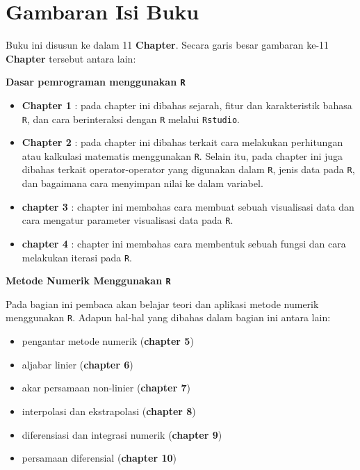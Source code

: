 \documentclass[
]{book}
\providecommand{\tightlist}{%
  \setlength{\itemsep}{0pt}\setlength{\parskip}{0pt}}
\theoremstyle{definition}
\theoremstyle{definition}
\theoremstyle{definition}
\theoremstyle{definition}
\theoremstyle{remark}
\begin{document}
\hypertarget{gambaran-isi-buku}{%
\section*{Gambaran Isi Buku}\label{gambaran-isi-buku}}

Buku ini disusun ke dalam 11 \textbf{Chapter}. Secara garis besar gambaran ke-11 \textbf{Chapter} tersebut antara lain:

\textbf{Dasar pemrograman menggunakan \texttt{R}}

\begin{itemize}
\tightlist
\item
  \textbf{Chapter 1} : pada chapter ini dibahas sejarah, fitur dan karakteristik bahasa \texttt{R}, dan cara berinteraksi dengan \texttt{R} melalui \texttt{Rstudio}.
\item
  \textbf{Chapter 2} : pada chapter ini dibahas terkait cara melakukan perhitungan atau kalkulasi matematis menggunakan \texttt{R}. Selain itu, pada chapter ini juga dibahas terkait operator-operator yang digunakan dalam \texttt{R}, jenis data pada \texttt{R}, dan bagaimana cara menyimpan nilai ke dalam variabel.
\item
  \textbf{chapter 3} : chapter ini membahas cara membuat sebuah visualisasi data dan cara mengatur parameter visualisasi data pada \texttt{R}.
\item
  \textbf{chapter 4} : chapter ini membahas cara membentuk sebuah fungsi dan cara melakukan iterasi pada \texttt{R}.
\end{itemize}

\textbf{Metode Numerik Menggunakan \texttt{R}}

Pada bagian ini pembaca akan belajar teori dan aplikasi metode numerik menggunakan \texttt{R}. Adapun hal-hal yang dibahas dalam bagian ini antara lain:

\begin{itemize}
\tightlist
\item
  pengantar metode numerik (\textbf{chapter 5})
\item
  aljabar linier (\textbf{chapter 6})
\item
  akar persamaan non-linier (\textbf{chapter 7})
\item
  interpolasi dan ekstrapolasi (\textbf{chapter 8})
\item
  diferensiasi dan integrasi numerik (\textbf{chapter 9})
\item
  persamaan diferensial (\textbf{chapter 10})
\end{itemize}
\end{document}
